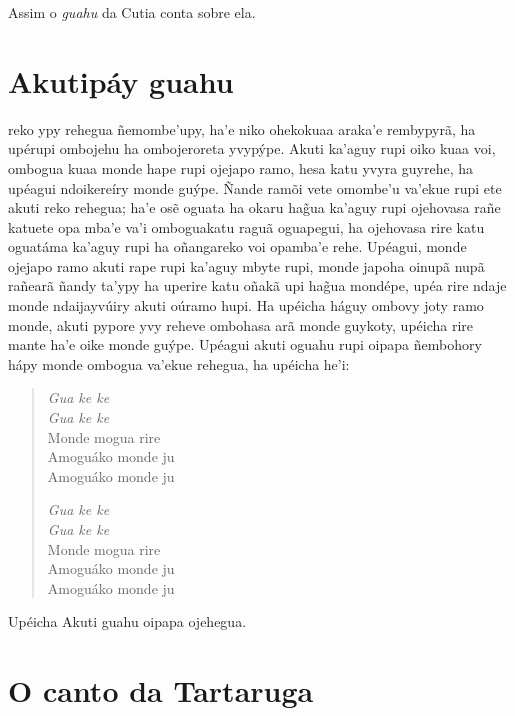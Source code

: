 Assim o \textit{guahu} da Cutia conta sobre ela.

\chapter{Akutipáy guahu}

 reko ypy rehegua ñemombe'upy, ha'e niko ohekokuaa araka'e
rembypyrã, ha upérupi ombojehu ha ombojeroreta yvypýpe. Akuti ka'aguy
rupi oiko kuaa voi, ombogua kuaa monde hape rupi ojejapo ramo, hesa katu
yvyra guyrehe, ha upéagui ndoikereíry monde guýpe. Ñande ramõi vete
omombe'u va'ekue rupi ete akuti reko rehegua; ha'e osẽ oguata ha okaru
hag̃ua ka'aguy rupi ojehovasa rañe katuete opa mba'e va'i omboguakatu
raguã oguapegui, ha ojehovasa rire katu oguatáma ka'aguy rupi ha
oñangareko voi opamba'e rehe. Upéagui, monde ojejapo ramo akuti rape
rupi ka'aguy mbyte rupi, monde japoha oinupã nupã rañearã ñandy ta'ypy
ha uperire katu oñakã upi hag̃ua mondépe, upéa rire ndaje monde
ndaijayvúiry akuti oúramo hupi. Ha upéicha háguy ombovy joty ramo monde,
akuti pypore yvy reheve ombohasa arã monde guykoty, upéicha rire mante
ha'e oike monde guýpe. Upéagui akuti oguahu rupi oipapa ñembohory hápy
monde ombogua va'ekue rehegua, ha upéicha he'i:

\begin{verse}
\textit{Gua ke ke}\\
\textit{Gua ke ke}\\
Monde mogua rire\\
Amoguáko monde ju\\
Amoguáko monde ju
       
\textit{Gua ke ke}\\
\textit{Gua ke ke}\\
Monde mogua rire\\
Amoguáko monde ju\\ \EP[1]
Amoguáko monde ju 
\end{verse}

Upéicha Akuti guahu oipapa ojehegua.

\chapter{O canto da Tartaruga}

